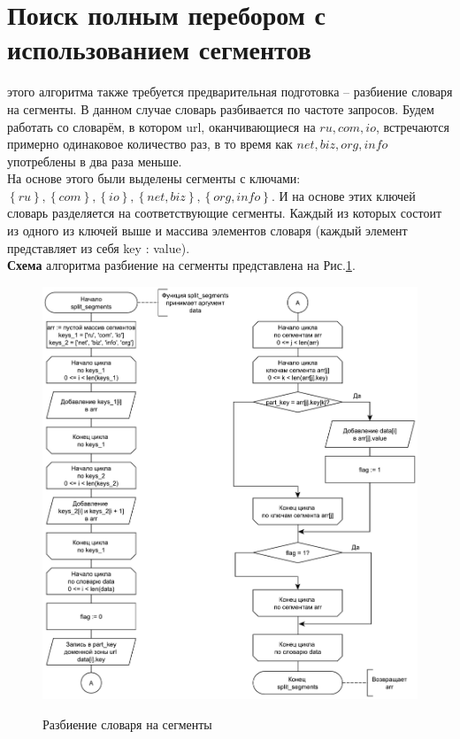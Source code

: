 \section{Поиск полным перебором с использованием сегментов}
 этого алгоритма также требуется предварительная подготовка -- разбиение словаря на сегменты. В данном случае словарь разбивается по частоте запросов. Будем работать со словарём, в котором url, оканчивающиеся на $ru, com, io$, встречаются примерно одинаковое количество раз,  в то время как $net, biz, org, info$ употреблены в два раза меньше. \\

На основе этого были выделены сегменты с ключами: $\left\{ ru \right\}, \left\{ com \right\}, \left\{ io \right\}, \left\{ net, biz \right\}, \left\{ org, info \right\}$. И на основе этих ключей словарь разделяется на соответствующие сегменты. Каждый из которых состоит из одного из ключей выше и массива элементов словаря (каждый элемент представляет из себя key : value).\\

\textbf{Схема} алгоритма разбиение на сегменты представлена на Рис.\ref{fig3:image}.\\

\newpage

\begin{figure}[pt!]
	\begin{center}
		{\includegraphics[scale = 0.6]{schemes/split}}
		\caption{Разбиение словаря на сегменты}
		\label{fig3:image}
	\end{center}
\end{figure}

